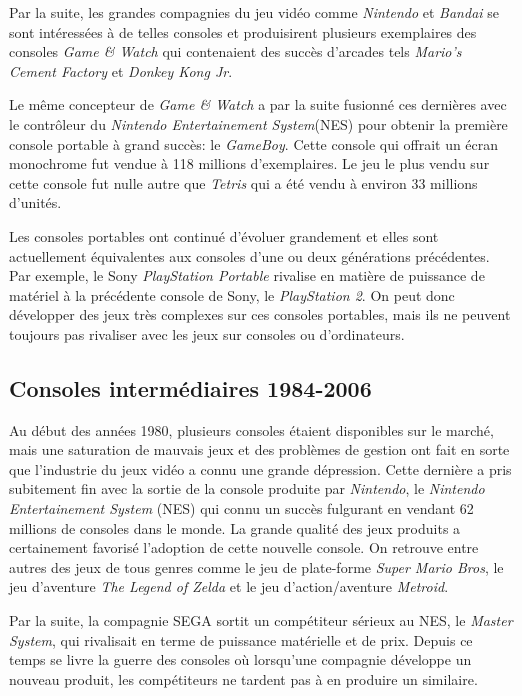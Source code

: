 \documentclass[12pt,twoside,letterpaper,francais]{book}
\begin{document}
Par la suite, les grandes compagnies du jeu vidéo comme
\textit{Nintendo} et \textit{Bandai} se sont intéressées à de telles
consoles et produisirent plusieurs exemplaires des consoles
\textit{Game \& Watch} qui contenaient des succès d'arcades tels
\textit{Mario's Cement Factory} et \textit{Donkey Kong Jr}.

Le même concepteur de \textit{Game \& Watch} a par la suite fusionné
ces dernières avec le contrôleur du \textit{Nintendo Entertainement
  System}(NES) pour obtenir la première console portable à grand
succès: le \textit{GameBoy}. Cette console qui offrait un écran
monochrome fut vendue à 118 millions d'exemplaires. Le jeu le plus
vendu sur cette console fut nulle autre que \textit{Tetris} qui a été
vendu à environ 33 millions d'unités.

Les consoles portables ont continué d'évoluer grandement et elles
sont actuellement équivalentes aux consoles d'une ou deux générations
précédentes. Par exemple, le Sony \textit{PlayStation Portable}
rivalise en matière de puissance de matériel à la précédente console
de Sony, le \textit{PlayStation 2}. On peut donc développer des jeux
très complexes sur ces consoles portables, mais ils ne peuvent toujours
pas rivaliser avec les jeux sur consoles ou d'ordinateurs.


\FloatBarrier
\subsection{Consoles intermédiaires 1984-2006}
Au début des années 1980, plusieurs consoles étaient disponibles sur
le marché, mais une saturation de mauvais jeux et des problèmes de
gestion ont fait en sorte que l'industrie du jeux vidéo a connu une
grande dépression. Cette dernière a pris subitement fin avec la sortie
de la console produite par \textit{Nintendo}, le \textit{Nintendo
  Entertainement System} (NES) qui connu un succès fulgurant en
vendant 62 millions de consoles dans le monde. La grande qualité des
jeux produits a certainement favorisé l'adoption de cette nouvelle
console. On retrouve entre autres des jeux de tous genres comme le jeu
de plate-forme \textit{Super Mario Bros}, le jeu d'aventure
\textit{The Legend of Zelda} et le jeu d'action/aventure
\textit{Metroid}.

Par la suite, la compagnie SEGA sortit un compétiteur sérieux au NES,
le \textit{Master System}, qui rivalisait en terme de puissance
matérielle et de prix. Depuis ce temps se livre la guerre des consoles
où lorsqu'une compagnie développe un nouveau produit, les compétiteurs
ne tardent pas à en produire un similaire.
\end{document}
